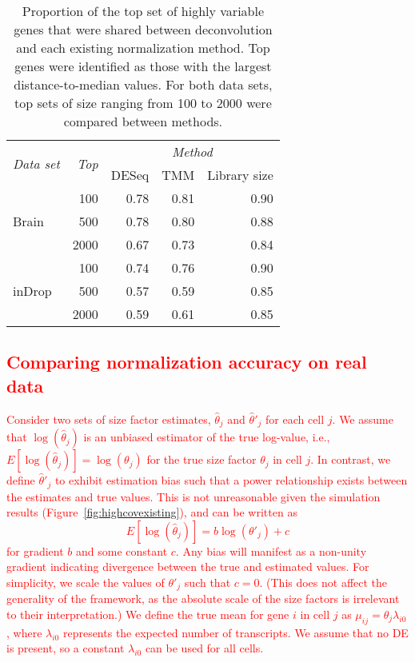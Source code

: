 \documentclass{article}
\newcommand\revised[1]{\textcolor{red}{#1}}
\begin{document}
\begin{table}[p]
    \caption{ 
        Proportion of the top set of highly variable genes that were shared between deconvolution and each existing normalization method.
        Top genes were identified as those with the largest distance-to-median values. 
        For both data sets, top sets of size ranging from 100 to 2000 were compared between methods.
    }
    \begin{center}
        \begin{tabular}{l r r r r}
            \hline
            \multirow{2}{*}{\textit{Data set}} & \multirow{2}{*}{\textit{Top}} & \multicolumn{3}{c}{\textit{Method}} \\
                \cline{3-5}
                & & DESeq & TMM & Library size \\
            \hline
            \multirow{3}{*}{Brain}            
            & 100  & 0.78 & 0.81 & 0.90 \\ 
            & 500  & 0.78 & 0.80 & 0.88 \\
            & 2000 & 0.67 & 0.73 & 0.84 \\
            \hline
            \multirow{3}{*}{inDrop}            
            & 100  & 0.74 & 0.76 & 0.90 \\ 
            & 500  & 0.57 & 0.59 & 0.85 \\
            & 2000 & 0.59 & 0.61 & 0.85 \\
            \hline
        \end{tabular}
    \end{center}
\end{table}

\revised{\section{Comparing normalization accuracy on real data}
Consider two sets of size factor estimates, $\hat\theta_j$ and $\hat\theta'_j$ for each cell $j$.
We assume that $\log(\hat\theta_j)$ is an unbiased estimator of the true log-value, i.e., $E[\log(\hat\theta_j)] = \log(\theta_j)$ for the true size factor $\theta_j$ in cell $j$.
In contrast, we define $\hat\theta'_j$ to exhibit estimation bias such that a power relationship exists between the estimates and true values.
This is not unreasonable given the simulation results (Figure~\ref{fig:highcovexisting}), and can be written as
\[
    E[\log(\hat\theta_j)] = b \log(\theta'_j) + c
\]
for gradient $b$ and some constant $c$. 
Any bias will manifest as a non-unity gradient indicating divergence between the true and estimated values.
For simplicity, we scale the values of $\theta'_j$ such that $c=0$. 
(This does not affect the generality of the framework, as the absolute scale of the size factors is irrelevant to their interpretation.)
We define the true mean for gene $i$ in cell $j$ as $\mu_{ij} = \theta_j\lambda_{i0}$, where $\lambda_{i0}$ represents the expected number of transcripts.
We assume that no DE is present, so a constant $\lambda_{i0}$ can be used for all cells.}
\end{document}
